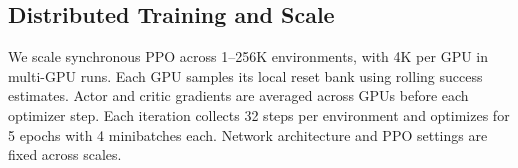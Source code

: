\subsection{Distributed Training and Scale}

We scale synchronous PPO across 1--256K environments, with 4K per GPU
in multi-GPU runs. Each GPU samples its local reset bank using rolling
success estimates. Actor and critic gradients are averaged across GPUs
before each optimizer step. 
Each iteration collects 32 steps per environment and optimizes for 5
epochs with 4 minibatches each. Network architecture and PPO settings
are fixed across scales.





